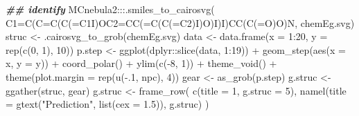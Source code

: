 \documentclass[
]{article}
\newenvironment{Shaded}{\begin{snugshade}}{\end{snugshade}}
\newcommand{\AttributeTok}[1]{\textcolor[rgb]{0.77,0.63,0.00}{#1}}
\newcommand{\DecValTok}[1]{\textcolor[rgb]{0.00,0.00,0.81}{#1}}
\newcommand{\DocumentationTok}[1]{\textcolor[rgb]{0.56,0.35,0.01}{\textbf{\textit{#1}}}}
\newcommand{\FloatTok}[1]{\textcolor[rgb]{0.00,0.00,0.81}{#1}}
\newcommand{\FunctionTok}[1]{\textcolor[rgb]{0.00,0.00,0.00}{#1}}
\newcommand{\NormalTok}[1]{#1}
\newcommand{\OtherTok}[1]{\textcolor[rgb]{0.56,0.35,0.01}{#1}}
\newcommand{\SpecialCharTok}[1]{\textcolor[rgb]{0.00,0.00,0.00}{#1}}
\newcommand{\StringTok}[1]{\textcolor[rgb]{0.31,0.60,0.02}{#1}}
\begin{document}
\begin{Shaded}
\begin{Highlighting}[]
\DocumentationTok{\#\# identify}
\NormalTok{MCnebula2}\SpecialCharTok{:::}\FunctionTok{.smiles\_to\_cairosvg}\NormalTok{(}
  \StringTok{\textquotesingle{}C1=C(C=C(C(=C1I)OC2=CC(=C(C(=C2)I)O)I)I)CC(C(=O)O)N\textquotesingle{}}\NormalTok{,}
  \StringTok{\textquotesingle{}chemEg.svg\textquotesingle{}}\NormalTok{)}
\NormalTok{struc }\OtherTok{\textless{}{-}} \FunctionTok{.cairosvg\_to\_grob}\NormalTok{(}\StringTok{\textquotesingle{}chemEg.svg\textquotesingle{}}\NormalTok{)}
\NormalTok{data }\OtherTok{\textless{}{-}} \FunctionTok{data.frame}\NormalTok{(}\AttributeTok{x =} \DecValTok{1}\SpecialCharTok{:}\DecValTok{20}\NormalTok{, }\AttributeTok{y =} \FunctionTok{rep}\NormalTok{(}\FunctionTok{c}\NormalTok{(}\DecValTok{0}\NormalTok{, }\DecValTok{1}\NormalTok{), }\DecValTok{10}\NormalTok{))}
\NormalTok{p.step }\OtherTok{\textless{}{-}} \FunctionTok{ggplot}\NormalTok{(dplyr}\SpecialCharTok{::}\FunctionTok{slice}\NormalTok{(data, }\DecValTok{1}\SpecialCharTok{:}\DecValTok{19}\NormalTok{)) }\SpecialCharTok{+}
  \FunctionTok{geom\_step}\NormalTok{(}\FunctionTok{aes}\NormalTok{(}\AttributeTok{x =}\NormalTok{ x, }\AttributeTok{y =}\NormalTok{ y)) }\SpecialCharTok{+}
  \FunctionTok{coord\_polar}\NormalTok{() }\SpecialCharTok{+}
  \FunctionTok{ylim}\NormalTok{(}\FunctionTok{c}\NormalTok{(}\SpecialCharTok{{-}}\DecValTok{8}\NormalTok{, }\DecValTok{1}\NormalTok{)) }\SpecialCharTok{+}
  \FunctionTok{theme\_void}\NormalTok{() }\SpecialCharTok{+}
  \FunctionTok{theme}\NormalTok{(}\AttributeTok{plot.margin =} \FunctionTok{rep}\NormalTok{(}\FunctionTok{u}\NormalTok{(}\SpecialCharTok{{-}}\NormalTok{.}\DecValTok{1}\NormalTok{, npc), }\DecValTok{4}\NormalTok{))}
\NormalTok{gear }\OtherTok{\textless{}{-}} \FunctionTok{as\_grob}\NormalTok{(p.step)}
\NormalTok{g.struc }\OtherTok{\textless{}{-}} \FunctionTok{ggather}\NormalTok{(struc, gear)}
\NormalTok{g.struc }\OtherTok{\textless{}{-}} \FunctionTok{frame\_row}\NormalTok{(}
  \FunctionTok{c}\NormalTok{(}\AttributeTok{title =} \DecValTok{1}\NormalTok{, }\AttributeTok{g.struc =} \DecValTok{5}\NormalTok{),}
  \FunctionTok{namel}\NormalTok{(}\AttributeTok{title =} \FunctionTok{gtext}\NormalTok{(}\StringTok{"Prediction"}\NormalTok{, }\FunctionTok{list}\NormalTok{(}\AttributeTok{cex =} \FloatTok{1.5}\NormalTok{)), g.struc)}
\NormalTok{)}


\end{Highlighting}
\end{Shaded}
\end{document}
